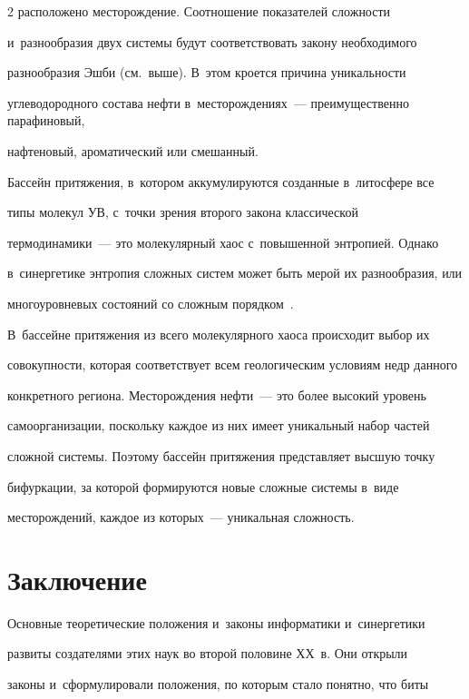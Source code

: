 \begin{multicols}{2}
расположено месторождение. Соотношение показателей слож\-ности 

и~разнообразия двух сис\-те\-мы будут соответствовать закону необходимого 

разнообразия Эшби (см.\ выше). В~этом кроется причина уни\-каль\-ности  

углеводородного со\-ста\-ва нефти в~месторождениях~--- преимущественно парафиновый, 

нафтеновый, ароматический или смешанный.



    Бассейн притяжения, в~котором аккумулируются созданные в~литосфере все 

типы молекул УВ, с~точки зрения второго закона классической  

термодинамики~--- это молекулярный хаос с~повышенной энтропией. Однако 

в~синергетике энтропия сложных систем может быть мерой их разнообразия, или 

многоуровневых состояний со сложным порядком~\cite[с.~79--80]{12-s}. 

В~бассейне притяжения из всего молекулярного хаоса происходит выбор их 

совокупности, которая соответствует всем геологическим условиям недр данного 

конкретного региона. Месторождения нефти~--- это более высокий уровень 

самоорганизации, поскольку каждое из них имеет уникальный набор частей 

сложной системы. Поэтому бассейн притяжения представляет высшую точку 

бифуркации, за которой формируются новые сложные сис\-те\-мы в~виде 

месторождений, каждое из которых~--- уникальная сложность.



\vspace*{-6pt}

    

\section{Заключение}



    Основные теоретические положения и~законы информатики и~синергетики 

развиты создателями этих наук во второй половине ХХ~в. Они открыли 

законы и~сформулировали положения, по которым стало понятно, что биты 


\end{multicols}
